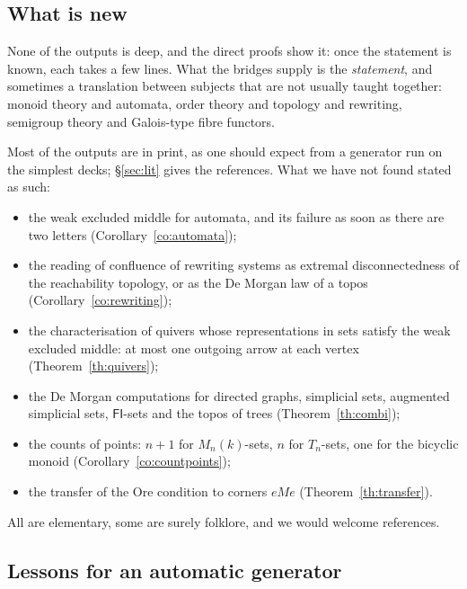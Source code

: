 \subsection{What is new}

None of the outputs is deep, and the direct proofs show it: once the statement is known, each takes a few lines. What the bridges supply is the \emph{statement}, and sometimes a translation between subjects that are not usually taught together: monoid theory and automata, order theory and topology and rewriting, semigroup theory and Galois-type fibre functors.

Most of the outputs are in print, as one should expect from a generator run on the simplest decks; \S\ref{sec:lit} gives the references. What we have not found stated as such:
\begin{itemize}
\item the weak excluded middle for automata, and its failure as soon as there are two letters (Corollary~\ref{co:automata});
\item the reading of confluence of rewriting systems as extremal disconnectedness of the reachability topology, or as the De Morgan law of a topos (Corollary~\ref{co:rewriting});
\item the characterisation of quivers whose representations in sets satisfy the weak excluded middle: at most one outgoing arrow at each vertex (Theorem~\ref{th:quivers});
\item the De Morgan computations for directed graphs, simplicial sets, augmented simplicial sets, $\mathsf{FI}$-sets and the topos of trees (Theorem~\ref{th:combi});
\item the counts of points: $n+1$ for $M_n(k)$-sets, $n$ for $T_n$-sets, one for the bicyclic monoid (Corollary~\ref{co:countpoints});
\item the transfer of the Ore condition to corners $eMe$ (Theorem~\ref{th:transfer}).
\end{itemize}
All are elementary, some are surely folklore, and we would welcome references.

\subsection{Lessons for an automatic generator}

